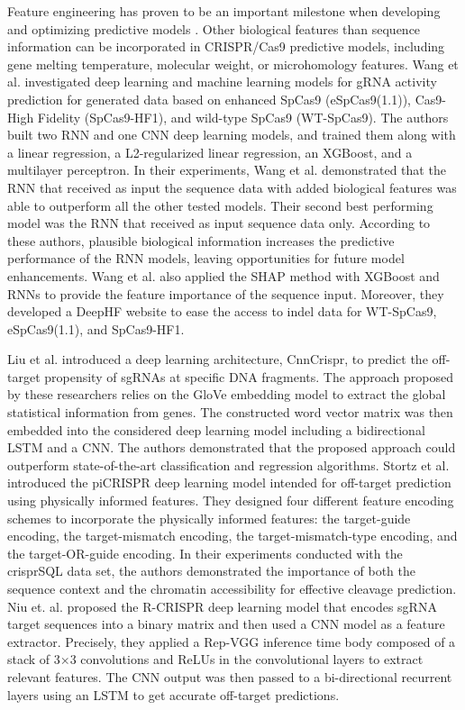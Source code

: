 \documentclass[unnumsec,webpdf,contemporary,large]{oup-authoring-template}
\theoremstyle{thmstyleone}%
\theoremstyle{thmstyletwo}%
\theoremstyle{thmstylethree}%
\begin{document}
Feature engineering has proven to be an important milestone when developing and optimizing predictive models \citep{heaton2018ian}. Other biological features than sequence information can be incorporated in CRISPR/Cas9 predictive models, including gene melting temperature, molecular weight, or microhomology features. Wang et al. \cite{wang2019optimized} investigated deep learning and machine learning models for gRNA activity prediction for generated data based on enhanced SpCas9 (eSpCas9(1.1)), Cas9-High Fidelity (SpCas9-HF1), and wild-type SpCas9 (WT-SpCas9). The authors built two RNN and one CNN deep learning models, and trained them along with a linear regression, a L2-regularized linear regression, an XGBoost, and a multilayer perceptron. In their experiments, Wang et al. demonstrated that the RNN that received as input the sequence data with added biological features was able to outperform all the other tested models. Their second best performing model was the RNN that received as input sequence data only. According to these authors, plausible biological information increases the predictive performance of the RNN models, leaving opportunities for future model enhancements. Wang et al. also applied the SHAP method with XGBoost and RNNs to provide the feature importance of the sequence input. Moreover, they developed a DeepHF website to ease the access to indel data for WT-SpCas9, eSpCas9(1.1), and SpCas9-HF1. 

Liu et al. \cite{liu2020deep} introduced a deep learning architecture, CnnCrispr, to predict the off-target propensity of sgRNAs at specific DNA fragments. The approach proposed by these researchers relies on the GloVe embedding model \cite{pennington2014glove} to extract the global statistical information from genes. The constructed word vector matrix was then embedded into the considered deep learning model including a bidirectional LSTM and a CNN. The authors demonstrated that the proposed approach could outperform state-of-the-art classification and regression algorithms. Stortz et al. \cite{stortz2021picrispr} introduced the piCRISPR deep learning model intended for off-target prediction using physically informed features. They designed four different feature encoding schemes to incorporate the physically informed features: the target-guide encoding, the target-mismatch encoding, the target-mismatch-type encoding, and the target-OR-guide encoding. In their experiments conducted with the crisprSQL data set, the authors demonstrated the importance of both the sequence context and the chromatin accessibility for effective cleavage prediction. Niu et. al. \cite{niu2021r} proposed the R-CRISPR deep learning model that encodes sgRNA target sequences into a binary matrix and then used a CNN model as a feature extractor. Precisely, they applied a Rep-VGG inference time body composed of a stack of 3×3 convolutions and ReLUs \citep{ding2021repvgg} in the convolutional layers to extract relevant features. The CNN output was then passed to a bi-directional recurrent layers using an LSTM to get accurate off-target predictions. 
\end{document}
